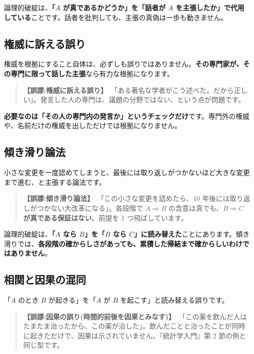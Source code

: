 \documentclass{article}
\begin{document}
論理的破綻は、\textbf{「\(A\) が真であるかどうか」を「話者が \(A\) を主張したか」で代用している}ことです。話者を批判しても、主張の真偽は一歩も動きません。

\subsection{権威に訴える誤り}

権威を根拠にすること自体は、必ずしも誤りではありません。\textbf{その専門家が、その専門に限って話した主張}なら有力な根拠になります。

\begin{quote}
\textbf{【誤謬:権威に訴える誤り】}\ 「ある著名な学者がこう述べた。だから正しい」。発言した人の専門は、議題の分野ではない、という点が問題です。
\end{quote}

\textbf{必要なのは「その人の専門内の発言か」というチェックだけ}です。専門外の権威や、名前だけの権威を出しただけでは根拠になりません。

\subsection{傾き滑り論法}

小さな変更を一度認めてしまうと、最後には取り返しがつかないほど大きな変更まで進む、と主張する論法です。

\begin{quote}
\textbf{【誤謬:傾き滑り論法】}\ 「この小さな変更を認めたら、10 年後には取り返しがつかない大改革になる」。各段階で \(A \Rightarrow B\) の含意は真でも、\textbf{\(B \Rightarrow C\) が真である保証はない}。前提を 1 つ飛ばしています。
\end{quote}

論理的破綻は、\textbf{「\(A\) なら \(B\)」を「\(B\) なら \(C\)」に読み替えた}ことにあります。傾き滑りでは、\textbf{各段階の確からしさがあっても、累積した帰結まで確からしいわけではありません}。

\subsection{相関と因果の混同}

「\(A\) のとき \(B\) が起きる」を「\(A\) が \(B\) を起こす」と読み替える誤りです。

\begin{quote}
\textbf{【誤謬:因果の誤り(時間的前後を因果とみなす)】}\  「この薬を飲んだ人はたまたま治ったから、この薬が治した」。飲んだことと治ったことが同時に起きただけで、因果は示されていません。『統計学入門』第 2 節の例と同じ型です。
\end{quote}
\end{document}
